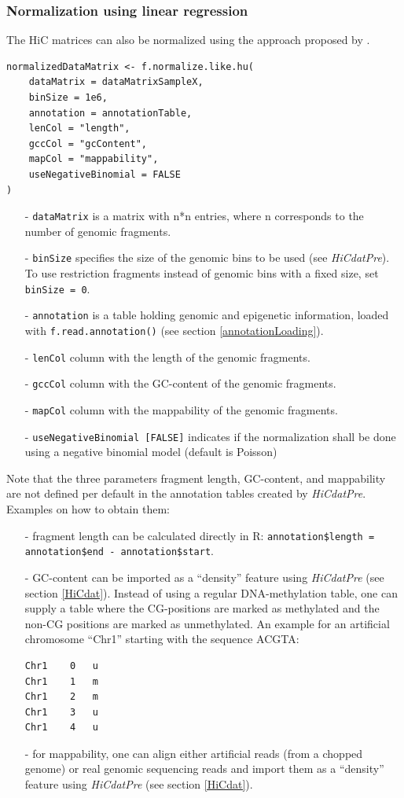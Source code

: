 \documentclass[a4paper,10pt]{article}
\begin{document}
\subsubsection{Normalization using linear regression}
The HiC matrices can also be normalized using the approach proposed by \cite{2012_Hu}.
\begin{verbatim}
normalizedDataMatrix <- f.normalize.like.hu(
    dataMatrix = dataMatrixSampleX,
    binSize = 1e6,
    annotation = annotationTable,
    lenCol = "length",
    gccCol = "gcContent",
    mapCol = "mappability",
    useNegativeBinomial = FALSE
)
\end{verbatim}
\begin{itemize}
 \item[-] \texttt{dataMatrix} is a matrix with n*n entries, where n corresponds to the number of genomic fragments.
 \item[-] \texttt{binSize} specifies the size of the genomic bins to be used (see \textit{HiCdatPre}). To use restriction fragments instead of genomic bins with a fixed size, set \texttt{binSize = 0}.
 \item[-] \texttt{annotation} is a table holding genomic and epigenetic information, loaded with \texttt{f.read.annotation()} (see section \ref{annotationLoading}).
 \item[-] \texttt{lenCol} column with the length of the genomic fragments.
 \item[-] \texttt{gccCol} column with the GC-content of the genomic fragments.
 \item[-] \texttt{mapCol} column with the mappability of the genomic fragments.
 \item[-] \texttt{useNegativeBinomial [FALSE]} indicates if the normalization shall be done using a negative binomial model (default is Poisson)
\end{itemize}
Note that the three parameters fragment length, GC-content, and mappability are not defined per default in the annotation tables created by \textit{HiCdatPre}. Examples on how to obtain them:
\begin{itemize}
 \item[-] fragment length can be calculated directly in R: \texttt{annotation\$length = annotation\$end - annotation\$start}.
 \item[-] GC-content can be imported as a ``density'' feature using \textit{HiCdatPre} (see section \ref{HiCdat}). Instead of using a regular DNA-methylation table, one can supply a table where the CG-positions are marked as methylated and the non-CG positions are marked as unmethylated. An example for an artificial chromosome ``Chr1'' starting with the sequence ACGTA:
\begin{verbatim}
Chr1	0	u
Chr1	1	m
Chr1	2	m
Chr1	3	u
Chr1	4	u
\end{verbatim}
 \item[-] for mappability, one can align either artificial reads (from a chopped genome) or real genomic sequencing reads and import them as a ``density'' feature using \textit{HiCdatPre} (see section \ref{HiCdat}). 
\end{itemize}
\end{document}
